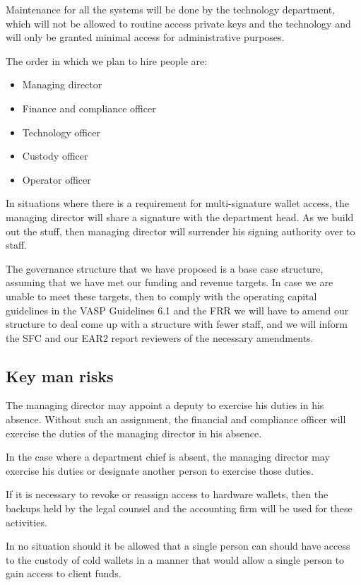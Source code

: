Maintenance for all the systems will be done by the technology
department, which will not be allowed to routine access private keys
and the technology and will only be granted minimal access for
administrative purposes.

The order in which we plan to hire people are:

\begin{itemize}
\item Managing director
\item Finance and compliance officer
\item Technology officer 
\item Custody officer
\item Operator officer
\end{itemize}

In situations where there is a requirement for multi-signature wallet
access, the managing director will share a signature with the
department head.  As we build out the stuff, then managing director
will surrender his signing authority over to staff.

The governance structure that we have proposed is a base case
structure, assuming that we have met our funding and revenue targets.
In case we are unable to meet these targets, then to comply with the
operating capital guidelines in the VASP Guidelines 6.1 and the FRR we
will have to amend our structure to deal come up with a structure with
fewer staff, and we will inform the SFC and our EAR2 report reviewers
of the necessary amendments.

\subsection{Key man risks}
The managing director may appoint a deputy to exercise his duties in
his absence.  Without such an assignment, the financial and
compliance officer will exercise the duties of the managing director
in his absence.

In the case where a department chief is absent, the managing director
may exercise his duties or designate another person to exercise those
duties.

If it is necessary to revoke or reassign access to hardware wallets,
then the backups held by the legal counsel and the accounting firm
will be used for these activities.

In no situation should it be allowed that a single person can should
have access to the custody of cold wallets in a manner that would allow a
single person to gain access to client funds.

